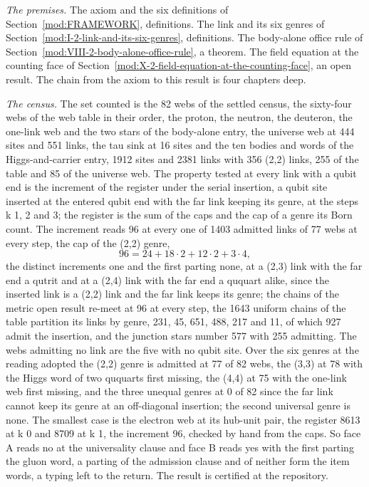 \begin{chproof}
\textit{The premises.} The axiom and the six definitions of Section~\ref{mod:FRAMEWORK}, definitions. The link and its six genres of Section~\ref{mod:I-2-link-and-its-six-genres}, definitions. The body-alone office rule of Section~\ref{mod:VIII-2-body-alone-office-rule}, a theorem. The field equation at the counting face of Section~\ref{mod:X-2-field-equation-at-the-counting-face}, an open result. The chain from the axiom to this result is four chapters deep.

\textit{The census.} The set counted is the 82 webs of the settled census, the sixty-four webs of the web table in their order, the proton, the neutron, the deuteron, the one-link web and the two stars of the body-alone entry, the universe web at 444 sites and 551 links, the tau sink at 16 sites and the ten bodies and words of the Higgs-and-carrier entry, 1912 sites and 2381 links with 356 (2,2) links, 255 of the table and 85 of the universe web. The property tested at every link with a qubit end is the increment of the register under the serial insertion, a qubit site inserted at the entered qubit end with the far link keeping its genre, at the steps k 1, 2 and 3; the register is the sum of the caps and the cap of a genre its Born count. The increment reads 96 at every one of 1403 admitted links of 77 webs at every step, the cap of the (2,2) genre,
\begin{equation}
96 = 24 + 18\cdot 2 + 12\cdot 2 + 3\cdot 4,
\end{equation}
the distinct increments one and the first parting none, at a (2,3) link with the far end a qutrit and at a (2,4) link with the far end a ququart alike, since the inserted link is a (2,2) link and the far link keeps its genre; the chains of the metric open result re-meet at 96 at every step, the 1643 uniform chains of the table partition its links by genre, 231, 45, 651, 488, 217 and 11, of which 927 admit the insertion, and the junction stars number 577 with 255 admitting. The webs admitting no link are the five with no qubit site. Over the six genres at the reading adopted the (2,2) genre is admitted at 77 of 82 webs, the (3,3) at 78 with the Higgs word of two ququarts first missing, the (4,4) at 75 with the one-link web first missing, and the three unequal genres at 0 of 82 since the far link cannot keep its genre at an off-diagonal insertion; the second universal genre is none. The smallest case is the electron web at its hub-unit pair, the register 8613 at k 0 and 8709 at k 1, the increment 96, checked by hand from the caps. So face A reads no at the universality clause and face B reads yes with the first parting the gluon word, a parting of the admission clause and of neither form the item words, a typing left to the return. The result is certified at the repository.


\end{chproof}

